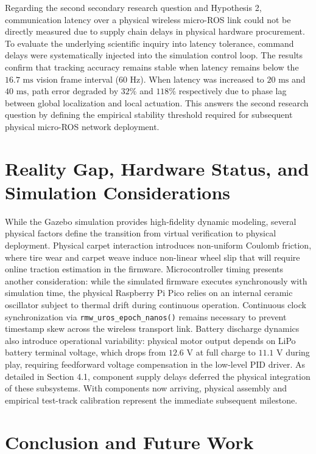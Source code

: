 \documentclass[a4paper,twoside,12pt]{report}
\begin{document}
Regarding the second secondary research question and Hypothesis 2, communication latency over a physical wireless micro-ROS link could not be directly measured due to supply chain delays in physical hardware procurement. To evaluate the underlying scientific inquiry into latency tolerance, command delays were systematically injected into the simulation control loop. The results confirm that tracking accuracy remains stable when latency remains below the $16.7\text{ ms}$ vision frame interval ($60\text{ Hz}$). When latency was increased to $20\text{ ms}$ and $40\text{ ms}$, path error degraded by $32\%$ and $118\%$ respectively due to phase lag between global localization and local actuation. This answers the second research question by defining the empirical stability threshold required for subsequent physical micro-ROS network deployment.

\section{Reality Gap, Hardware Status, and Simulation Considerations}

While the Gazebo simulation provides high-fidelity dynamic modeling, several physical factors define the transition from virtual verification to physical deployment. Physical carpet interaction introduces non-uniform Coulomb friction, where tire wear and carpet weave induce non-linear wheel slip that will require online traction estimation in the firmware. Microcontroller timing presents another consideration: while the simulated firmware executes synchronously with simulation time, the physical Raspberry Pi Pico relies on an internal ceramic oscillator subject to thermal drift during continuous operation. Continuous clock synchronization via \texttt{rmw\_uros\_epoch\_nanos()} remains necessary to prevent timestamp skew across the wireless transport link. Battery discharge dynamics also introduce operational variability: physical motor output depends on LiPo battery terminal voltage, which drops from $12.6\text{ V}$ at full charge to $11.1\text{ V}$ during play, requiring feedforward voltage compensation in the low-level PID driver. As detailed in Section 4.1, component supply delays deferred the physical integration of these subsystems. With components now arriving, physical assembly and empirical test-track calibration represent the immediate subsequent milestone.

\section{Conclusion and Future Work}
\end{document}
